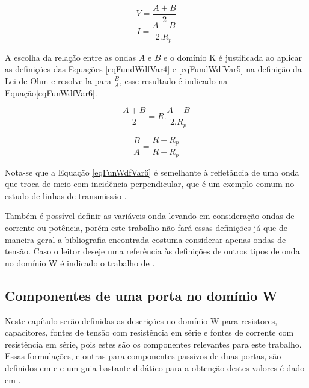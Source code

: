 	\begin{equation}
		\label{eqFundWdfVar4}
		V = \frac{A + B}{2}
	\end{equation} 
	\begin{equation}
		\label{eqFundWdfVar5}
		I = \frac{A - B }{2 . R_p}
	\end{equation}
	
	A escolha da relação entre as ondas $A$ e $B$ e o domínio K é justificada ao aplicar as definições das Equações \ref{eqFundWdfVar4} e \ref{eqFundWdfVar5} na definição da Lei de Ohm e resolve-la para $\frac{B}{A}$, esse resultado é indicado na Equação\ref{eqFunWdfVar6}. 
	
	\begin{equation}
		\frac{A + B}{2} = R . \frac{A - B}{2 . R_p}
	\end{equation}
	
	\begin{equation}
		\label{eqFunWdfVar6}
		\frac{B}{A} = \frac{R-R_p}{R+R_p}
	\end{equation}
	
	Nota-se que a Equação \ref{eqFunWdfVar6} é semelhante à refletância de uma onda que troca de meio com incidência perpendicular, que é um exemplo comum no estudo de linhas de transmissão \cite{Ida1992}.
	
	Também é possível definir as variáveis onda levando em consideração ondas de corrente ou potência, porém este trabalho não fará essas definições já que de maneira geral a bibliografia encontrada costuma considerar apenas ondas de tensão. Caso o leitor deseje uma referência às definições de outros tipos de onda no domínio W é indicado o trabalho de . 
	
	\subsection{Componentes de uma porta no domínio W}
	\label{secFundWdfComp}
	
	Neste capítulo serão definidas as descrições no domínio W para resistores, capacitores, fontes de tensão com resistência em série e fontes de corrente com resistência em série, pois estes são os componentes relevantes para este trabalho. Essas formulações, e outras para componentes passivos de duas portas, são definidos em  e  e um guia bastante didático para a obtenção destes valores é dado em .
	
